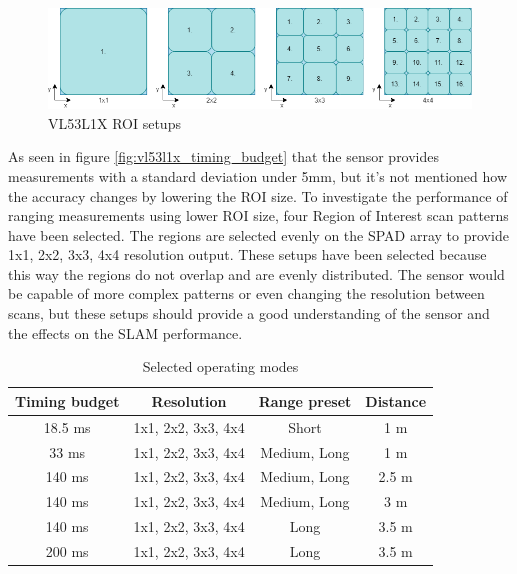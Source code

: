 \begin{figure}[!ht]
    \centering
    \includegraphics[width=150mm, keepaspectratio]{figures/vl53l1x_spad_arrays.png}
    \caption{VL53L1X ROI setups}
    \label{fig:vl53l1x_spad_arrays}
\end{figure}

As seen in figure \ref{fig:vl53l1x_timing_budget} that the sensor provides measurements with a standard deviation
under 5mm, but it's not mentioned how the accuracy changes by lowering the ROI size. To investigate the
performance of ranging measurements using lower ROI size, four Region of Interest scan patterns have been selected.
The regions are selected evenly on the SPAD array to provide 1x1, 2x2, 3x3, 4x4 resolution output. These setups
have been selected because this way the regions do not overlap and are evenly distributed. The sensor would be
capable of more complex patterns or even changing the resolution between scans, but these setups should provide
a good understanding of the sensor and the effects on the SLAM performance.

\begin{table}[ht]
	\centering
	\begin{tabular}{||c c c c||}
		\hline
        Timing budget       & Resolution        & Range preset      & Distance  \\
		\hline\hline
        18.5 ms      & 1x1, 2x2, 3x3, 4x4      & Short      & 1 m \\
		\hline
        33 ms        & 1x1, 2x2, 3x3, 4x4      & Medium, Long       & 1 m \\
		\hline
        140 ms       & 1x1, 2x2, 3x3, 4x4      & Medium, Long       & 2.5 m \\
		\hline
        140 ms       & 1x1, 2x2, 3x3, 4x4      & Medium, Long       & 3 m \\
		\hline
        140 ms       & 1x1, 2x2, 3x3, 4x4      & Long       & 3.5 m \\
		\hline
        200 ms       & 1x1, 2x2, 3x3, 4x4      & Long       & 3.5 m \\
		\hline
	\end{tabular}
	\caption{Selected operating modes}
	\label{tab:selected_operating_modes}
\end{table}

